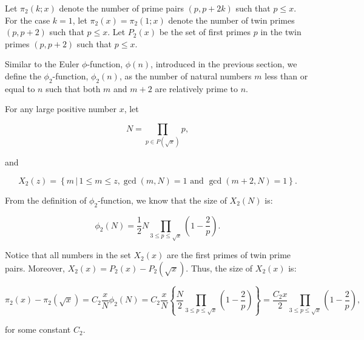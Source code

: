 \documentclass{aomart}
\begin{document}
Let \( \pi_{2}(k;x) \) denote the number of prime pairs \( (p, p+2k) \) such that \( p \leq x \). For the case \( k = 1 \), let \( \pi_{2}(x) = \pi_{2}(1;x) \) denote the number of twin primes \( (p, p+2) \) such that \( p \leq x \). Let \( P_{2}(x) \) be the set of first primes \( p \) in the twin primes \( (p, p+2) \) such that \( p \leq x \).
\vspace{1\baselineskip}

Similar to the Euler \( \phi \)-function, \( \phi(n) \), introduced in the previous section, we define the \( \phi_{2} \)-function, \( \phi_{2}(n) \), as the number of natural numbers \( m \) less than or equal to \( n \) such that both \( m \) and \( m+2 \) are relatively prime to \( n \).
\vspace{1\baselineskip}

For any large positive number \( x \), let 

\begin{equation}
N = \prod_{p \in P(\sqrt{x})} p,
\end{equation}

and

\begin{equation}
X_{2}(z) = \left\{ m \, | \, 1 \leq m \leq z, \gcd(m,N) = 1 \text{ and } \gcd(m+2,N) = 1 \right\}.
\end{equation}
\vspace{1\baselineskip}

From the definition of \( \phi_{2} \)-function, we know that the size of \( X_{2}(N) \) is:


\begin{equation}
 \phi_{2}\left(N\right) = \frac{1}{2} N\prod_{3\leq p\leq\sqrt{x}}^{}(1-\frac{2}{p} ) .
\end{equation}
\vspace{1\baselineskip}

Notice that all numbers in the set \( X_{2}(x) \) are the first primes of twin prime pairs. Moreover, \( X_{2}(x) = P_{2}(x) - P_{2}(\sqrt{x}) \). Thus, the size of \( X_{2}(x) \) is:

\begin{equation}
\pi_{2}(x) - \pi_{2}(\sqrt{x}) = C_{2} \frac{x}{N} \phi_{2}(N) = C_{2} \frac{x}{N} \left\{ \frac{N}{2} \prod_{3 \leq p \leq \sqrt{x}} \left(1-\frac{2}{p}\right) \right\} = \frac{C_{2}x}{2} \prod_{3 \leq p \leq \sqrt{x}} \left(1-\frac{2}{p}\right),
\end{equation}

for some constant \( C_{2} \).
\vspace{1\baselineskip}
\end{document}
